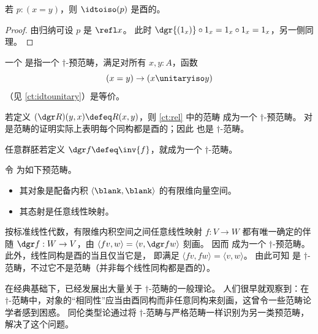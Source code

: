 \begin{lem}\label{ct:idtounitary}
  若 $p:(x=y)$，则 $\idtoiso(p)$ 是酉的。
\end{lem}
\begin{proof}
  由归纳可设 $p$ 是 $\refl x$。
  此时 $\dgr{(1_x)} \circ 1_x = 1_x\circ 1_x = 1_x$，另一侧同理。
\end{proof}

\begin{defn}\label{ct:dagger-category}
  一个
  是指一个 $\dagger$-预范畴，满足对所有 $x,y:A$，函数
  \[ (x=y) \to (x \unitaryiso y) \]
  （见 \cref{ct:idtounitary}）是等价。
\end{defn}

\begin{eg}\label{ct:rel-dagger-cat}
  若定义 $(\dgr R)(y,x) \defeq R(x,y)$，则 \cref{ct:rel} 中的范畴 \urel 成为一个 $\dagger$-预范畴。
  对 \urel 是范畴的证明实际上表明每个同构都是酉的；因此 \urel 也是 $\dagger$-范畴。
\end{eg}

\begin{eg}\label{ct:groupoid-dagger-cat}
  任意群胚若定义 $\dgr f \defeq \inv{f}$，就成为一个 $\dagger$-范畴。
\end{eg}

\begin{eg}\label{ct:hilb}
  令 \uhilb 为如下预范畴。
  \begin{itemize}
  \item 其对象是配备内积 $\langle \blank,\blank\rangle$ 的有限维向量空间。
  \item 其态射是任意线性映射。
  \end{itemize}
  按标准线性代数，有限维内积空间之间任意线性映射 $f:V\to W$ 都有唯一确定的伴随 $\dgr f:W\to V$，由 $\langle f v,w\rangle = \langle v,\dgr f w\rangle$ 刻画。
  因而 \uhilb 成为一个 $\dagger$-预范畴。
  此外，线性同构是酉的当且仅当它是，
  即满足 $\langle fv,fw\rangle = \langle v,w\rangle$。
  由此可知 \uhilb 是 $\dagger$-范畴，不过它不是范畴（并非每个线性同构都是酉的）。
\end{eg}

在经典基础下，已经发展出大量关于 $\dagger$-范畴的一般理论。
人们很早就观察到：在 $\dagger$-范畴中，对象的“相同性”应当由酉同构而非任意同构来刻画，这曾令一些范畴论学者感到困惑。
同伦类型论通过将 $\dagger$-范畴与严格范畴一样识别为另一类预范畴，解决了这个问题。

